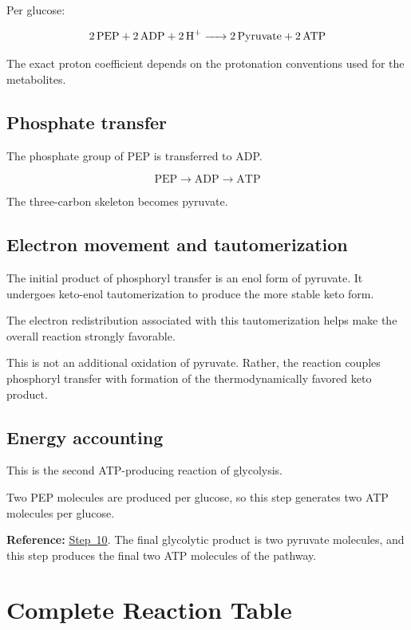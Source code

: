 \documentclass[11pt,a4paper]{article}
\newcommand{\stepref}[1]{\hyperref[step:#1]{Step~#1}}
\newcommand{\Note}[1]{\par\smallskip
  \noindent\colorbox{gray!12}{
    \parbox{0.96\linewidth}{#1}
  }\par\smallskip}
\begin{document}
Per glucose:

\[
\ce{
2 PEP + 2 ADP + 2H+
-> 2 Pyruvate + 2 ATP
}
\]

The exact proton coefficient depends on the protonation conventions
used for the metabolites.

\subsection{Phosphate transfer}

The phosphate group of PEP is transferred to ADP.

\[
\boxed{
\text{PEP}
\longrightarrow
\text{ADP}
\longrightarrow
\text{ATP}
}
\]

The three-carbon skeleton becomes pyruvate.

\subsection{Electron movement and tautomerization}

The initial product of phosphoryl transfer is an enol form of
pyruvate. It undergoes keto-enol tautomerization to produce the
more stable keto form.

The electron redistribution associated with this tautomerization
helps make the overall reaction strongly favorable.

This is not an additional oxidation of pyruvate. Rather, the
reaction couples phosphoryl transfer with formation of the
thermodynamically favored keto product.

\subsection{Energy accounting}

This is the second ATP-producing reaction of glycolysis.

Two PEP molecules are produced per glucose, so this step generates
two ATP molecules per glucose.

\Note{
\textbf{Reference:} \stepref{10}. The final glycolytic product is
two pyruvate molecules, and this step produces the final two ATP
molecules of the pathway.
}

\section{Complete Reaction Table}
\label{sec:reaction-table}
\end{document}

